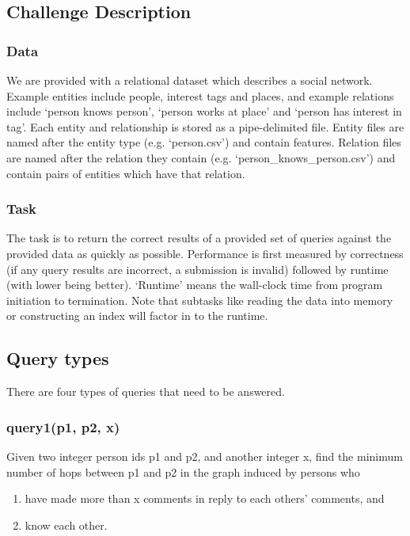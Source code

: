 \documentclass{article}
\begin{document}
\subsection{Challenge Description}

\subsubsection{Data}
We are provided with a relational dataset which describes a social
network.  Example entities include people, interest tags and places, 
and example relations include `person knows person', `person works at place'
and `person has interest in tag'.  Each entity and
relationship is stored as a pipe-delimited file.  Entity files are
named after the entity type (e.g. `person.csv') and contain features.
Relation files are named after the relation they contain
(e.g. `person\_knows\_person.csv') and contain pairs of entities which
have that relation.

\subsubsection{Task}
The task is to return the correct results of a provided set of queries
against the provided data as quickly as possible.  Performance is
first measured by correctness (if any query results are incorrect, a
submission is invalid) followed by runtime (with lower being better).
`Runtime' means the wall-clock time from program initiation to
termination.  Note that subtasks like reading the data into memory or
constructing an index will factor in to the runtime.

\subsection{Query types}
There are four types of queries that need to be answered.

\subsubsection{query1(p1, p2, x)}
Given two integer person ids p1 and p2, and another integer x, find
the minimum number of hops between p1 and p2 in the graph induced by
persons who
\begin{enumerate}
\item have made more than x comments in reply to each others'
comments, and
\item know each other.
\end{enumerate}
\end{document}
